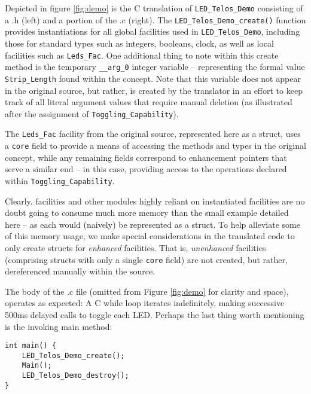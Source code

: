 Depicted in figure \ref{fig:demo} is the C translation of \texttt{LED\_Telos\_Demo} consisting of a .h (left) and a portion of the .c (right). The \texttt{LED\_Telos\_Demo\_create()} function provides instantiations for all global facilities used in \texttt{LED\_Telos\_Demo}, including those for standard types such as integers, booleans, clock, as well as local facilities such as \texttt{Leds\_Fac}. One additional thing to note within this create method is the temporary \texttt{\_\_arg\_0} integer variable -- representing the formal value \texttt{Strip\_Length} found within the concept. Note that this variable does not appear in the original source, but rather, is created by the translator in an effort to keep track of all literal argument values that require manual deletion (as illustrated after the assignment of \texttt{Toggling\_Capability}).

The \texttt{Leds\_Fac} facility from the original source, represented here as a struct, uses a \texttt{core} field to provide a means of accessing the methods and types in the original concept, while any remaining fields correspond to enhancement pointers that serve a similar end -- in this case, providing access to the operations declared within  \texttt{Toggling\_Capability}.

Clearly, facilities and other modules highly reliant on instantiated facilities are no doubt going to consume much more memory than the small example detailed here -- as each would (naively) be represented as a struct. To help alleviate some of this memory usage, we make special considerations in the translated code to only create structs for \textit{enhanced} facilities. That is, \textit{unenhanced} facilities (comprising structs with only a single \texttt{core} field) are not created, but rather, dereferenced manually within the source.

The body of the .c file (omitted from Figure \ref{fig:demo} for clarity and space), operates as expected: A C while loop iterates indefinitely, making successive 500ms delayed calls to toggle each LED. Perhaps the last thing worth mentioning is the invoking main method:

\begin{verbatim}
int main() {
    LED_Telos_Demo_create();
    Main();
    LED_Telos_Demo_destroy();
}
\end{verbatim}



